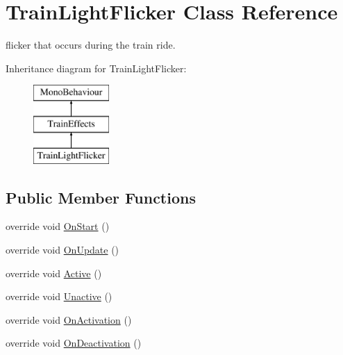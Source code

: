 \hypertarget{class_train_light_flicker}{}\section{Train\+Light\+Flicker Class Reference}
\label{class_train_light_flicker}


flicker that occurs during the train ride.  


Inheritance diagram for Train\+Light\+Flicker\+:\begin{figure}[H]
\begin{center}
\leavevmode
\includegraphics[height=3.000000cm]{class_train_light_flicker}
\end{center}
\end{figure}
\subsection*{Public Member Functions}
\begin{DoxyCompactItemize}
\item 
override void \mbox{\hyperlink{class_train_light_flicker_a815f82ff9fe20dc1ea162df8eee0a6cf}{On\+Start}} ()
\item 
override void \mbox{\hyperlink{class_train_light_flicker_ad39662ddbaa2a6b30a2c1711cda88c54}{On\+Update}} ()
\item 
override void \mbox{\hyperlink{class_train_light_flicker_a56fcd413440a84b2974c8c37df9b8119}{Active}} ()
\item 
override void \mbox{\hyperlink{class_train_light_flicker_a82942fb531694697ed18e20a15740d01}{Unactive}} ()
\item 
override void \mbox{\hyperlink{class_train_light_flicker_ac3959dac6aa192f03d493625d28a14de}{On\+Activation}} ()
\item 
override void \mbox{\hyperlink{class_train_light_flicker_aa1f0646e2c9224f0765ab172515490ee}{On\+Deactivation}} ()
\end{DoxyCompactItemize}
